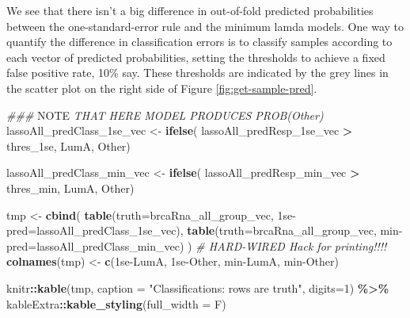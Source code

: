 \documentclass[
]{book}
\newenvironment{Shaded}{\begin{snugshade}}{\end{snugshade}}
\newcommand{\AlertTok}[1]{\textcolor[rgb]{0.94,0.16,0.16}{#1}}
\newcommand{\CommentTok}[1]{\textcolor[rgb]{0.56,0.35,0.01}{\textit{#1}}}
\newcommand{\DataTypeTok}[1]{\textcolor[rgb]{0.13,0.29,0.53}{#1}}
\newcommand{\DecValTok}[1]{\textcolor[rgb]{0.00,0.00,0.81}{#1}}
\newcommand{\KeywordTok}[1]{\textcolor[rgb]{0.13,0.29,0.53}{\textbf{#1}}}
\newcommand{\NormalTok}[1]{#1}
\newcommand{\OperatorTok}[1]{\textcolor[rgb]{0.81,0.36,0.00}{\textbf{#1}}}
\newcommand{\StringTok}[1]{\textcolor[rgb]{0.31,0.60,0.02}{#1}}
\begin{document}
We see that there isn't a big difference in out-of-fold predicted
probabilities between the one-standard-error rule and the minimum lamda models.
One way to quantify
the difference in classification errors is to classify samples
according to each vector of predicted probabilities, setting
the thresholds to achieve a fixed false positive rate, 10\% say.
These thresholds are indicated by the grey lines in the scatter plot
on the right side of Figure \ref{fig:get-sample-pred}.

\begin{Shaded}
\begin{Highlighting}[]
\CommentTok{\#\#\# }\AlertTok{NOTE}\CommentTok{ THAT HERE MODEL PRODUCES PROB(Other)}
\NormalTok{lassoAll\_predClass\_1se\_vec <{-}}\StringTok{ }\KeywordTok{ifelse}\NormalTok{(}
\NormalTok{ lassoAll\_predResp\_1se\_vec }\OperatorTok{>}\StringTok{ }\NormalTok{thres\_1se, }\StringTok{\textquotesingle{}LumA\textquotesingle{}}\NormalTok{, }\StringTok{\textquotesingle{}Other\textquotesingle{}}\NormalTok{)}

\NormalTok{lassoAll\_predClass\_min\_vec <{-}}\StringTok{ }\KeywordTok{ifelse}\NormalTok{(}
\NormalTok{ lassoAll\_predResp\_min\_vec }\OperatorTok{>}\StringTok{ }\NormalTok{thres\_min, }\StringTok{\textquotesingle{}LumA\textquotesingle{}}\NormalTok{, }\StringTok{\textquotesingle{}Other\textquotesingle{}}\NormalTok{)}

\NormalTok{tmp <{-}}\StringTok{ }\KeywordTok{cbind}\NormalTok{(}
 \KeywordTok{table}\NormalTok{(}\DataTypeTok{truth=}\NormalTok{brcaRna\_all\_group\_vec, }\StringTok{\textasciigrave{}}\DataTypeTok{1se{-}pred}\StringTok{\textasciigrave{}}\NormalTok{=lassoAll\_predClass\_1se\_vec),}
 \KeywordTok{table}\NormalTok{(}\DataTypeTok{truth=}\NormalTok{brcaRna\_all\_group\_vec, }\StringTok{\textasciigrave{}}\DataTypeTok{min{-}pred}\StringTok{\textasciigrave{}}\NormalTok{=lassoAll\_predClass\_min\_vec)}
\NormalTok{) }
\CommentTok{\# HARD{-}WIRED Hack for printing!!!!}
\KeywordTok{colnames}\NormalTok{(tmp) <{-}}\StringTok{ }\KeywordTok{c}\NormalTok{(}\StringTok{\textquotesingle{}1se{-}LumA\textquotesingle{}}\NormalTok{, }\StringTok{\textquotesingle{}1se{-}Other\textquotesingle{}}\NormalTok{, }\StringTok{\textquotesingle{}min{-}LumA\textquotesingle{}}\NormalTok{, }\StringTok{\textquotesingle{}min{-}Other\textquotesingle{}}\NormalTok{)}

\NormalTok{knitr}\OperatorTok{::}\KeywordTok{kable}\NormalTok{(tmp,}
  \DataTypeTok{caption =} \StringTok{"Classifications: rows are truth"}\NormalTok{,}
  \DataTypeTok{digits=}\DecValTok{1}\NormalTok{) }\OperatorTok{\%>\%}
\StringTok{   }\NormalTok{kableExtra}\OperatorTok{::}\KeywordTok{kable\_styling}\NormalTok{(}\DataTypeTok{full\_width =}\NormalTok{ F)}
\end{Highlighting}
\end{Shaded}
\end{document}
